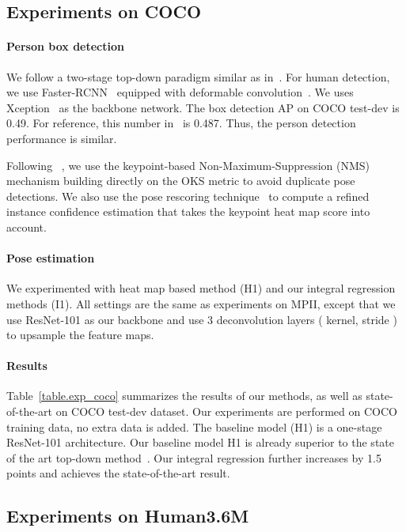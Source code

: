 \documentclass[runningheads]{llncs}
\begin{document}
\subsection{Experiments on COCO}
\label{sec.exp_coco}

\paragraph{\textbf{Person box detection}} We follow a two-stage top-down paradigm similar as in~\cite{papandreou2017towards}.
For human detection, we use Faster-RCNN~\cite{ren2015faster} equipped with deformable convolution~\cite{dai2017deformable}. We uses Xception~\cite{chollet2016xception} as the backbone network. The box detection AP on COCO test-dev is 0.49. For reference, this number in~\cite{papandreou2017towards} is 0.487. Thus, the person detection performance is similar.

Following ~\cite{papandreou2017towards}, we use the keypoint-based Non-Maximum-Suppression (NMS) mechanism building directly on the OKS metric to avoid duplicate pose detections. We also use the pose rescoring technique~\cite{papandreou2017towards} to compute a refined instance confidence estimation that takes the keypoint heat map score into account.

\paragraph{\textbf{Pose estimation}} 
We experimented with heat map based method (H1) and our integral regression methods (I1). All settings are the same as experiments on MPII, except that we use ResNet-101 as our backbone and use 3 deconvolution layers ( kernel, stride ) to upsample the feature maps. 
 
\paragraph{\textbf{Results}} Table~\ref{table.exp_coco} summarizes the results of our methods, as well as state-of-the-art on COCO test-dev dataset. Our experiments are performed on COCO training data, no extra data is added. The baseline model (H1) is a one-stage ResNet-101 architecture. Our baseline model H1 is already superior to the state of the art top-down method~\cite{papandreou2017towards}. Our integral regression further increases  by 1.5 points and achieves the state-of-the-art result.


\subsection{Experiments on Human3.6M}
\label{sec.exp_hm36}
\end{document}
